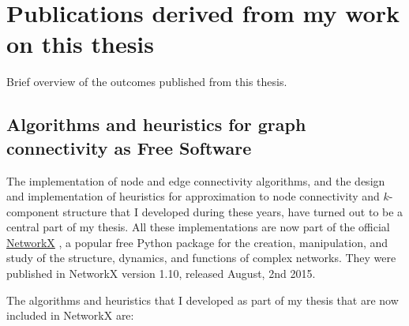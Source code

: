 \chapter{Publications derived from my work on this thesis}

Brief overview of the outcomes published from this thesis.

\section{Algorithms and heuristics for graph connectivity as Free Software}

The implementation of node and edge connectivity algorithms, and the design and implementation of heuristics for approximation to node connectivity and $k$-component structure that I developed during these years, have turned out to be a central part of my thesis. All these implementations are now part of the official \href{https://networkx.github.io/}{NetworkX} \citep{hagberg:2008}, a popular free Python package for the creation, manipulation, and study of the structure, dynamics, and functions of complex networks. They were published in NetworkX version 1.10, released August, 2nd 2015.

The algorithms and heuristics that I developed as part of my thesis that are now included in NetworkX are: 

